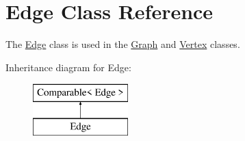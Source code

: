 \hypertarget{class_edge}{}\section{Edge Class Reference}
\label{class_edge}


The \hyperlink{class_edge}{Edge} class is used in the \hyperlink{class_graph}{Graph} and \hyperlink{class_vertex}{Vertex} classes.  


Inheritance diagram for Edge\+:\begin{figure}[H]
\begin{center}
\leavevmode
\includegraphics[height=2.000000cm]{class_edge}
\end{center}
\end{figure}
